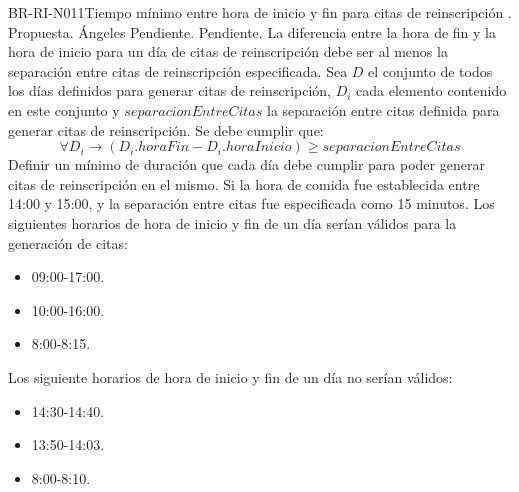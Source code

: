 \begin{BusinessRule}{BR-RI-N011}{Tiempo mínimo entre hora de inicio y fin para citas de reinscripción}
	{\bcCondition}   %
	{\btTimer}    %
	{\blControlling}    %
	.
	\BRItem[Estado] Propuesta.
	 Ángeles 
	 Pendiente.
	 Pendiente.
	\BRItem[Descripción] La diferencia entre la hora de fin y la hora de inicio para un día de citas de reinscripción debe ser al menos la separación entre citas de reinscripción especificada.
	\BRItem[Sentencia] Sea $D$ el conjunto de todos los días definidos para generar citas de reinscripción, $D_i$ cada elemento contenido en este conjunto y $separacionEntreCitas$ la separación entre citas definida para generar citas de reinscripción. Se debe cumplir que:
		$$ \forall D_i \rightarrow (D_i.horaFin - D_i.horaInicio) \geq separacionEntreCitas $$
%	
	\BRItem[Motivación] Definir un mínimo de duración que cada día debe cumplir para poder generar citas de reinscripción en el mismo.
	\BRItem[Ejemplo] Si la hora de comida fue establecida entre 14:00 y 15:00, y la separación entre citas fue especificada como 15 minutos.\newline
	Los siguientes horarios de hora de inicio y fin de un día serían válidos para la generación de citas:
	\begin{itemize}
		\item 09:00-17:00.
		\item 10:00-16:00.
		\item 8:00-8:15.
	\end{itemize}
	Los siguiente horarios de hora de inicio y fin de un día no serían válidos:
	\begin{itemize}
		\item 14:30-14:40.
		\item 13:50-14:03.
		\item 8:00-8:10.
	\end{itemize}
\end{BusinessRule}

